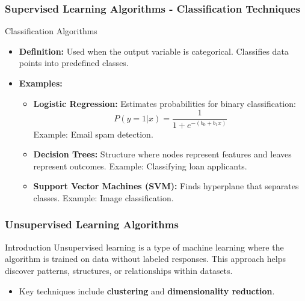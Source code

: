 \documentclass[aspectratio=169]{beamer}
\begin{document}
\begin{frame}[fragile]
    \frametitle{Supervised Learning Algorithms - Classification Techniques}
    \begin{block}{Classification Algorithms}
        \begin{itemize}
            \item \textbf{Definition:} Used when the output variable is categorical. Classifies data points into predefined classes.
            \item \textbf{Examples:}
            \begin{itemize}
                \item \textbf{Logistic Regression:} Estimates probabilities for binary classification:
                \[
                P(y=1|x) = \frac{1}{1 + e^{-(b_0 + b_1x)}}
                \]
                Example: Email spam detection.
                \item \textbf{Decision Trees:} Structure where nodes represent features and leaves represent outcomes.
                Example: Classifying loan applicants.
                \item \textbf{Support Vector Machines (SVM):} Finds hyperplane that separates classes.
                Example: Image classification.
            \end{itemize}
        \end{itemize}
    \end{block}
\end{frame}

\begin{frame}
    \frametitle{Unsupervised Learning Algorithms}
    \begin{block}{Introduction}
        Unsupervised learning is a type of machine learning where the algorithm is trained on data without labeled responses. This approach helps discover patterns, structures, or relationships within datasets.
    \end{block}
    \begin{itemize}
        \item Key techniques include \textbf{clustering} and \textbf{dimensionality reduction}.
    \end{itemize}
\end{frame}
\end{document}
